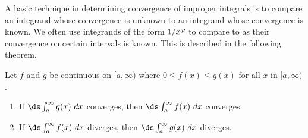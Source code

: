 A basic technique in determining convergence of improper integrals is to compare an integrand whose convergence is unknown to an integrand whose convergence is known. We often use integrands of the form $1/x\hskip1pt ^p$ to compare to as their convergence on certain intervals is known. This is described in the following theorem.


{%
Let $f$ and $g$ be continuous on $[a,\infty)$ where $0\leq f(x)\leq g(x)$ for all $x$ in $[a,\infty)$. 
	\begin{enumerate}
	\item		If $\ds \int_a^\infty g(x)\ dx$ converges, then $\ds \int_a^\infty f(x)\ dx$ converges.
	\item		If $\ds \int_a^\infty f(x)\ dx$ diverges, then $\ds \int_a^\infty g(x)\ dx$ diverges.
	\end{enumerate}

}

